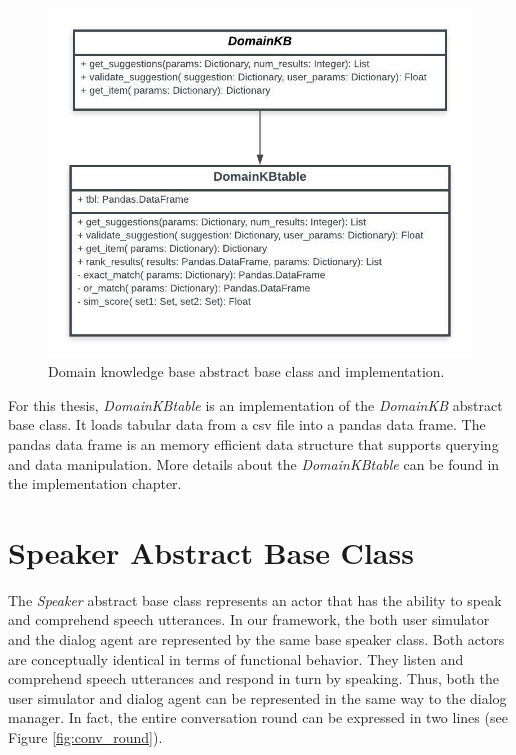 \begin{figure}[h!]
	\centering
	\includegraphics[scale=.8]{diagrams/domain_kb_class.jpeg}
	\caption{ Domain knowledge base abstract base class and implementation.  }
	\label{fig:domain_kb}
\end{figure}

For this thesis, \textit{DomainKBtable} is an implementation of the \textit{DomainKB} abstract base class. It loads tabular data from a csv file into a pandas data frame. The pandas data frame is an memory efficient data structure that supports querying and data manipulation. More details about the \textit{DomainKBtable} can be found in the implementation chapter. 

\section{Speaker Abstract Base Class}
\label{sssec:speaker}

The \textit{Speaker} abstract base class represents an actor that has the ability to speak and comprehend speech utterances. In our framework, the both user simulator and the dialog agent are represented by the same base speaker class. Both actors are conceptually identical in terms of functional behavior. They listen and comprehend speech utterances and respond in turn by speaking. Thus, both the user simulator and dialog agent can be represented in the same way to the dialog manager. In fact, the entire conversation round can be expressed in two lines (see Figure \ref{fig:conv_round}).

